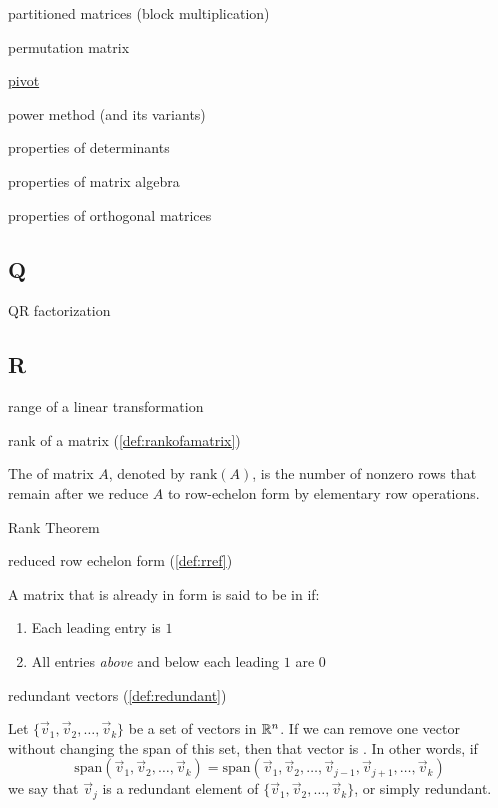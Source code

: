 \documentclass{ximera}
\begin{document}
partitioned matrices (block multiplication)

permutation matrix

\href{https://ximera.osu.edu/oerlinalg/LinearAlgebra/SYS-0030/main}{pivot}

power method (and its variants)

properties of determinants

properties of matrix algebra

properties of orthogonal matrices

\subsection{Q}

QR factorization

\subsection{R}

range of a linear transformation

rank of a matrix (\ref{def:rankofamatrix})
\begin{expandable}
    The  of matrix $A$, denoted by $\mbox{rank}(A)$, is the number of nonzero rows that remain after we reduce $A$ to row-echelon form by elementary row operations.
\end{expandable}

Rank Theorem

reduced row echelon form (\ref{def:rref})
\begin{expandable}
    A matrix that is already in  form is said to be in  if:
\begin{enumerate}
\item Each leading entry is $1$
\item All entries {\it above} and below each leading $1$ are $0$
\end{enumerate}
\end{expandable}

redundant vectors (\ref{def:redundant})
\begin{expandable}
    Let $\{\vec{v}_1,\vec{v}_2,\dots,\vec{v}_k\}$ be a set of vectors in $\mathbb{R}^n$.  If we can remove one vector without changing the span of this set, then that vector is .  In other words, if $$\mbox{span}\left(\vec{v}_1,\vec{v}_2,\dots,\vec{v}_k\right)=\mbox{span}\left(\vec{v}_1,\vec{v}_2,\dots,\vec{v}_{j-1},\vec{v}_{j+1},\dots,\vec{v}_k\right)$$ we say that $\vec{v}_j$ is a redundant element of $\{\vec{v}_1,\vec{v}_2,\dots,\vec{v}_k\}$, or simply redundant.
\end{expandable}
\end{document}
